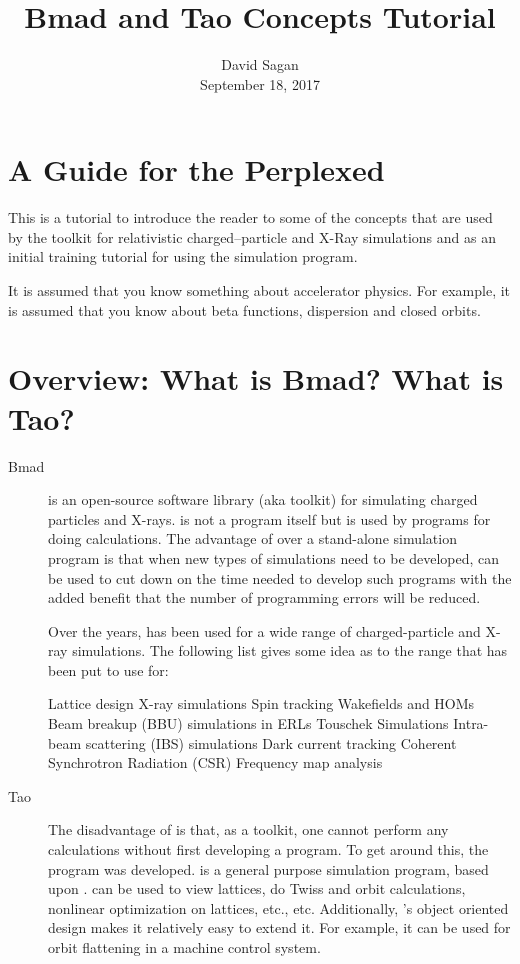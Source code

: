 \documentclass{hitec}
\title{Bmad and Tao Concepts Tutorial}
\author{}
\date{David Sagan \\ September 18, 2017}
\newcommand{\Section}[1]{\section{#1}\vspace*{-1ex}}
\begin{document}
\maketitle

\tableofcontents

\Section{A Guide for the Perplexed}
\label{s:guide}

This is a tutorial to introduce the reader to some of the concepts that are used by the \bmad toolkit
for relativistic charged--particle and X-Ray simulations and as an initial training tutorial
for using the \tao simulation program.

It is assumed that you know something about accelerator physics. For example, it is assumed that
you know about beta functions, dispersion and closed orbits.

\Section{Overview: What is Bmad? What is Tao?}
\label{s:overview}

  \begin{description}
  \item[Bmad] \Newline
\bmad is an open-source software library (aka toolkit) for simulating charged particles
and X-rays. \bmad is not a program itself but is used by programs for doing
calculations. 
The advantage of \bmad over a stand-alone simulation program is that when new types of simulations
need to be developed, \bmad can be used to cut down on the time needed to develop such programs
with the added benefit that the number of programming errors will be reduced.

Over the years, \bmad has been used for a wide range of charged-particle and X-ray
simulations. The following list gives some idea as to the range that \bmad has been put to use
for:
{\small
\begin{code}
  Lattice design                              X-ray simulations
  Spin tracking                               Wakefields and HOMs
  Beam breakup (BBU) simulations in ERLs      Touschek Simulations
  Intra-beam scattering (IBS) simulations     Dark current tracking
  Coherent Synchrotron Radiation (CSR)        Frequency map analysis
\end{code}}

  \item[Tao] \Newline
The disadvantage of \bmad is that, as a toolkit, one cannot perform any calculations
without first developing a program. To get around this, the \tao program was developed.
\tao is a general purpose simulation program, based upon \bmad. \tao can be used to view
lattices, do Twiss and orbit calculations, nonlinear optimization on lattices, etc., etc.
Additionally, \tao's object oriented design makes it relatively easy to extend it. For
example, it can be used for orbit flattening in a machine control system.
  \end{description}
\end{document}
